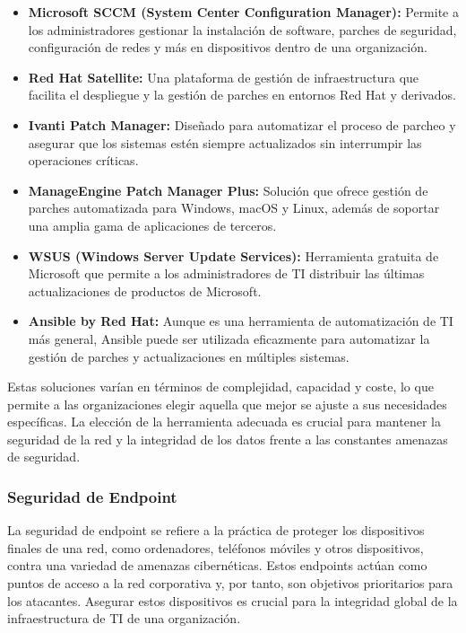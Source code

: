 \begin{itemize}
    \item \textbf{Microsoft SCCM (System Center Configuration Manager):} Permite a los administradores gestionar la instalación de software, parches de seguridad, configuración de redes y más en dispositivos dentro de una organización.
    \item \textbf{Red Hat Satellite:} Una plataforma de gestión de infraestructura que facilita el despliegue y la gestión de parches en entornos Red Hat y derivados.
    \item \textbf{Ivanti Patch Manager:} Diseñado para automatizar el proceso de parcheo y asegurar que los sistemas estén siempre actualizados sin interrumpir las operaciones críticas.
    \item \textbf{ManageEngine Patch Manager Plus:} Solución que ofrece gestión de parches automatizada para Windows, macOS y Linux, además de soportar una amplia gama de aplicaciones de terceros.
    \item \textbf{WSUS (Windows Server Update Services):} Herramienta gratuita de Microsoft que permite a los administradores de TI distribuir las últimas actualizaciones de productos de Microsoft.
    \item \textbf{Ansible by Red Hat:} Aunque es una herramienta de automatización de TI más general, Ansible puede ser utilizada eficazmente para automatizar la gestión de parches y actualizaciones en múltiples sistemas.
\end{itemize}

Estas soluciones varían en términos de complejidad, capacidad y coste, lo que permite a las organizaciones elegir aquella que mejor se ajuste a sus necesidades específicas. La elección de la herramienta adecuada es crucial para mantener la seguridad de la red y la integridad de los datos frente a las constantes amenazas de seguridad.



\subsubsection{Seguridad de Endpoint}

La seguridad de endpoint se refiere a la práctica de proteger los dispositivos finales de una red, como ordenadores, teléfonos móviles y otros dispositivos, contra una variedad de amenazas cibernéticas. Estos endpoints actúan como puntos de acceso a la red corporativa y, por tanto, son objetivos prioritarios para los atacantes. Asegurar estos dispositivos es crucial para la integridad global de la infraestructura de TI de una organización.

